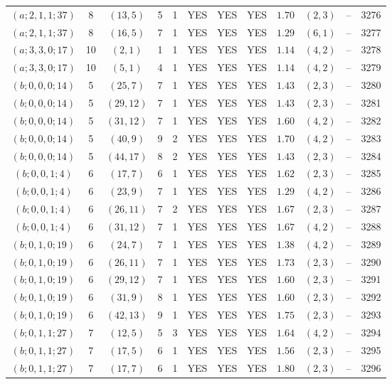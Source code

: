 \begin{longtable}{|c|c|c|c|c|c|c|c|c|c|c|c|}
$(a;2,1,1;37)$ & 8 & $(13,5)$ & 5 & 1 & YES & YES & YES & $1.70$ & $(2,3)$ & -- & 3276\\
$(a;2,1,1;37)$ & 8 & $(16,5)$ & 7 & 1 & YES & YES & YES & $1.29$ & $(6,1)$ & -- & 3277\\
$(a;3,3,0;17)$ & 10 & $(2,1)$ & 1 & 1 & YES & YES & YES & $1.14$ & $(4,2)$ & -- & 3278\\
$(a;3,3,0;17)$ & 10 & $(5,1)$ & 4 & 1 & YES & YES & YES & $1.14$ & $(4,2)$ & -- & 3279\\
$(b;0,0,0;14)$ & 5 & $(25,7)$ & 7 & 1 & YES & YES & YES & $1.43$ & $(2,3)$ & -- & 3280\\
$(b;0,0,0;14)$ & 5 & $(29,12)$ & 7 & 1 & YES & YES & YES & $1.43$ & $(2,3)$ & -- & 3281\\
$(b;0,0,0;14)$ & 5 & $(31,12)$ & 7 & 1 & YES & YES & YES & $1.60$ & $(4,2)$ & -- & 3282\\
$(b;0,0,0;14)$ & 5 & $(40,9)$ & 9 & 2 & YES & YES & YES & $1.70$ & $(4,2)$ & -- & 3283\\
$(b;0,0,0;14)$ & 5 & $(44,17)$ & 8 & 2 & YES & YES & YES & $1.43$ & $(2,3)$ & -- & 3284\\
$(b;0,0,1;4)$ & 6 & $(17,7)$ & 6 & 1 & YES & YES & YES & $1.62$ & $(2,3)$ & -- & 3285\\
$(b;0,0,1;4)$ & 6 & $(23,9)$ & 7 & 1 & YES & YES & YES & $1.29$ & $(4,2)$ & -- & 3286\\
$(b;0,0,1;4)$ & 6 & $(26,11)$ & 7 & 2 & YES & YES & YES & $1.67$ & $(2,3)$ & -- & 3287\\
$(b;0,0,1;4)$ & 6 & $(31,12)$ & 7 & 1 & YES & YES & YES & $1.67$ & $(4,2)$ & -- & 3288\\
$(b;0,1,0;19)$ & 6 & $(24,7)$ & 7 & 1 & YES & YES & YES & $1.38$ & $(4,2)$ & -- & 3289\\
$(b;0,1,0;19)$ & 6 & $(26,11)$ & 7 & 1 & YES & YES & YES & $1.73$ & $(2,3)$ & -- & 3290\\
$(b;0,1,0;19)$ & 6 & $(29,12)$ & 7 & 1 & YES & YES & YES & $1.60$ & $(2,3)$ & -- & 3291\\
$(b;0,1,0;19)$ & 6 & $(31,9)$ & 8 & 1 & YES & YES & YES & $1.60$ & $(2,3)$ & -- & 3292\\
$(b;0,1,0;19)$ & 6 & $(42,13)$ & 9 & 1 & YES & YES & YES & $1.75$ & $(2,3)$ & -- & 3293\\
$(b;0,1,1;27)$ & 7 & $(12,5)$ & 5 & 3 & YES & YES & YES & $1.64$ & $(4,2)$ & -- & 3294\\
$(b;0,1,1;27)$ & 7 & $(17,5)$ & 6 & 1 & YES & YES & YES & $1.56$ & $(2,3)$ & -- & 3295\\
$(b;0,1,1;27)$ & 7 & $(17,7)$ & 6 & 1 & YES & YES & YES & $1.80$ & $(2,3)$ & -- & 3296\\

\end{longtable}
